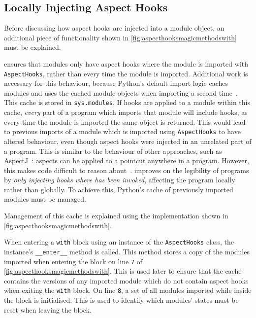 \subsection{Locally Injecting Aspect Hooks}
\label{local_aspect_hook_effects}

Before discussing how aspect hooks are injected into a module object, an
additional piece of functionality shown in
\cref{fig:aspecthooksmagicmethodswith} must be explained.

\pdsfthree{} ensures that modules only have aspect hooks where the module is
imported with \lstinline{AspectHooks}, rather than every time the module is
imported. Additional work is necessary for this behaviour, because Python's
default import logic caches modules and uses the cached module objects when
importing a second time~\cite{python_import_cache_definition}. This cache is
stored in \lstinline{sys.modules}. If hooks are applied to a module within this
cache, \emph{every} part of a program which imports that module will include
hooks, as every time the module is imported the same object is returned. This
would lead to previous imports of a module which is imported using
\lstinline{AspectHooks} to have altered behaviour, even though aspect hooks were
injected in an unrelated part of a program. This is similar to the behaviour of
other \aop{} approaches, such as AspectJ~\cite{AspectJLanguageAndTools}: aspects
can be applied to a pointcut anywhere in a program. However, this makes code
difficult to reason about~\cite{steimann06paradoxical,przybylek2010wrong}.
\pdsfthree{} improves on the legibility of \aspectoriented programs by
\emph{only injecting hooks where \pdsfthree{} has been invoked}, affecting the
program locally rather than globally. To achieve this, Python's cache of
previously imported modules must be managed.

Management of this cache is explained using the implementation shown in
\cref{fig:aspecthooksmagicmethodswith}.

When entering a \lstinline{with} block using an instance of the
\lstinline{AspectHooks} class, the instance's \lstinline{__enter__} method is
called. This method stores a copy of the modules imported when entering the
block on line \texttt{7} of \cref{fig:aspecthooksmagicmethodswith}. This is used
later to ensure that the cache contains the versions of any imported module
which do not contain aspect hooks when exiting the \lstinline{with} block. On
line \texttt{8}, a set of all modules imported while inside the block is
initialised. This is used to identify which modules' states must be reset when
leaving the block.

